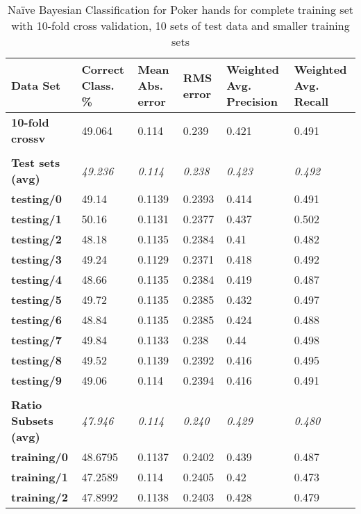 \documentclass[10pt, a4paper]{article}
\begin{document}
\begin{table}[htbp]
  \centering
  \begin{tabular}{p{3cm}p{1.5cm}p{1.5cm}p{1.5cm}p{1.5cm}p{1.5cm}}
    \toprule
    \textbf{Data Set} & Correct Class. \% & Mean Abs. error & RMS error & Weighted Avg. Precision & Weighted Avg. Recall \\
    \midrule
    \textbf{10-fold crossv} & 49.064 & 0.114 & 0.239 & 0.421 & 0.491 \\
    \textbf{} &       &       &       &       &  \\
    \textbf{Test sets (avg)} & \textit{49.236} & \textit{0.114} & \textit{0.238} & \textit{0.423} & \textit{0.492} \\
    \textbf{   testing/0} & 49.14 & 0.1139 & 0.2393 & 0.414 & 0.491 \\
    \textbf{   testing/1} & 50.16 & 0.1131 & 0.2377 & 0.437 & 0.502 \\
    \textbf{   testing/2} & 48.18 & 0.1135 & 0.2384 & 0.41  & 0.482 \\
    \textbf{   testing/3} & 49.24 & 0.1129 & 0.2371 & 0.418 & 0.492 \\
    \textbf{   testing/4} & 48.66 & 0.1135 & 0.2384 & 0.419 & 0.487 \\
    \textbf{   testing/5} & 49.72 & 0.1135 & 0.2385 & 0.432 & 0.497 \\
    \textbf{   testing/6} & 48.84 & 0.1135 & 0.2385 & 0.424 & 0.488 \\
    \textbf{   testing/7} & 49.84 & 0.1133 & 0.238 & 0.44  & 0.498 \\
    \textbf{   testing/8} & 49.52 & 0.1139 & 0.2392 & 0.416 & 0.495 \\
    \textbf{   testing/9} & 49.06 & 0.114 & 0.2394 & 0.416 & 0.491 \\
    \textbf{} &       &       &       &       &  \\
    \textbf{Ratio Subsets (avg)} & \textit{47.946} & \textit{0.114} & \textit{0.240} & \textit{0.429} & \textit{0.480} \\
    \textbf{   training/0} & 48.6795 & 0.1137 & 0.2402 & 0.439 & 0.487 \\
    \textbf{   training/1} & 47.2589 & 0.114 & 0.2405 & 0.42  & 0.473 \\
    \textbf{   training/2} & 47.8992 & 0.1138 & 0.2403 & 0.428 & 0.479 \\
    \bottomrule
    \end{tabular}%


	\caption{Na\"ive Bayesian Classification for Poker hands for complete training set with 10-fold cross validation, 10 sets of test data and smaller training sets}   
  \label{tab:nbresults}%
\end{table}%
\end{document}
